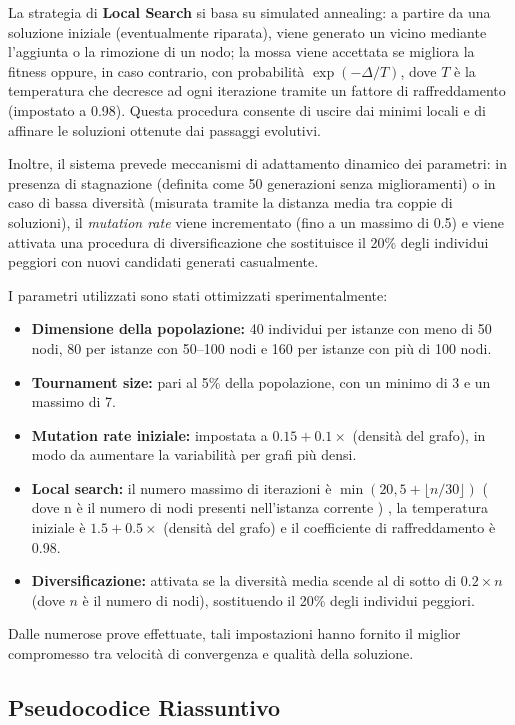 \documentclass[12pt,a4paper,twoside]{article}
\begin{document}
La strategia di \textbf{Local Search} si basa su simulated annealing: a partire da una soluzione iniziale (eventualmente riparata), viene generato un vicino mediante l'aggiunta o la rimozione di un nodo; la mossa viene accettata se migliora la fitness oppure, in caso contrario, con probabilità \(\exp(-\Delta/T)\), dove \(T\) è la temperatura che decresce ad ogni iterazione tramite un fattore di raffreddamento (impostato a 0.98). Questa procedura consente di uscire dai minimi locali e di affinare le soluzioni ottenute dai passaggi evolutivi.

Inoltre, il sistema prevede meccanismi di adattamento dinamico dei parametri: in presenza di stagnazione (definita come 50 generazioni senza miglioramenti) o in caso di bassa diversità (misurata tramite la distanza media tra coppie di soluzioni), il \emph{mutation rate} viene incrementato (fino a un massimo di 0.5) e viene attivata una procedura di diversificazione che sostituisce il 20\% degli individui peggiori con nuovi candidati generati casualmente.

I parametri utilizzati sono stati ottimizzati sperimentalmente:
\begin{itemize}
    \item\textbf{Dimensione della popolazione:} 40 individui per istanze con meno di 50 nodi, 80 per istanze con 50--100 nodi e 160 per istanze con più di 100 nodi.
    \item \textbf{Tournament size:} pari al 5\% della popolazione, con un minimo di 3 e un massimo di 7.
    \item \textbf{Mutation rate iniziale:} impostata a \(0.15 + 0.1 \times\) (densità del grafo), in modo da aumentare la variabilità per grafi più densi.
    \item \textbf{Local search:} il numero massimo di iterazioni è \(\min(20, 5 + \lfloor n/30 \rfloor)\) ( dove n è il numero di nodi presenti nell'istanza corrente ) , la temperatura iniziale è \(1.5 + 0.5 \times\) (densità del grafo) e il coefficiente di raffreddamento è 0.98.
    \item \textbf{Diversificazione:} attivata se la diversità media scende al di sotto di \(0.2 \times n\) (dove \(n\) è il numero di nodi), sostituendo il 20\% degli individui peggiori.
\end{itemize}
Dalle numerose prove effettuate, tali impostazioni hanno fornito il miglior compromesso tra velocità di convergenza e qualità della soluzione.

\subsection*{Pseudocodice Riassuntivo}
\end{document}
